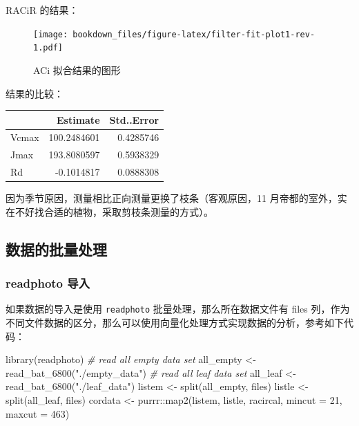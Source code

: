 \documentclass[
]{krantz}
\makeatletter
\newenvironment{Shaded}{\begin{snugshade}}{\end{snugshade}}
\newcommand{\AttributeTok}[1]{\textcolor[rgb]{0.77,0.63,0.00}{#1}}
\newcommand{\CommentTok}[1]{\textcolor[rgb]{0.56,0.35,0.01}{\textit{#1}}}
\newcommand{\DecValTok}[1]{\textcolor[rgb]{0.00,0.00,0.81}{#1}}
\newcommand{\FunctionTok}[1]{\textcolor[rgb]{0.00,0.00,0.00}{#1}}
\newcommand{\NormalTok}[1]{#1}
\newcommand{\OtherTok}[1]{\textcolor[rgb]{0.56,0.35,0.01}{#1}}
\newcommand{\SpecialCharTok}[1]{\textcolor[rgb]{0.00,0.00,0.00}{#1}}
\newcommand{\StringTok}[1]{\textcolor[rgb]{0.31,0.60,0.02}{#1}}
\newenvironment{kframe}{%
\medskip{}
\setlength{\fboxsep}{.8em}
 \def\at@end@of@kframe{}%
 \ifinner\ifhmode%
  \def\at@end@of@kframe{\end{minipage}}%
  \begin{minipage}{\columnwidth}%
 \fi\fi%
 \def\FrameCommand##1{\hskip\@totalleftmargin \hskip-\fboxsep
 \colorbox{shadecolor}{##1}\hskip-\fboxsep
     \hskip-\linewidth \hskip-\@totalleftmargin \hskip\columnwidth}%
 \MakeFramed {\advance\hsize-\width
   \@totalleftmargin\z@ \linewidth\hsize
   \@setminipage}}%
 {\par\unskip\endMakeFramed%
 \at@end@of@kframe}
\renewenvironment{Shaded}{\begin{kframe}}{\end{kframe}}
\makeatother
\begin{document}
RACiR 的结果：

\begin{figure}
\centering
\texttt{[image: bookdown\_files/figure-latex/filter-fit-plot1-rev-1.pdf]}
\caption{\label{fig:filter-fit-plot1-rev}ACi 拟合结果的图形}
\end{figure}

结果的比较：

\begin{tabular}{l|r|r}
\hline
  & Estimate & Std..Error\\
\hline
Vcmax & 100.2484601 & 0.4285746\\
\hline
Jmax & 193.8080597 & 0.5938329\\
\hline
Rd & -0.1014817 & 0.0888308\\
\hline
\end{tabular}

因为季节原因，测量相比正向测量更换了枝条（客观原因，11 月帝都的室外，实在不好找合适的植物，采取剪枝条测量的方式）。

\hypertarget{racirbatch}{%
\subsection{数据的批量处理}\label{racirbatch}}

\hypertarget{imbyphoto}{%
\subsubsection{readphoto 导入}\label{imbyphoto}}

如果数据的导入是使用 \texttt{readphoto} 批量处理，那么所在数据文件有 files 列，作为不同文件数据的区分，那么可以使用向量化处理方式实现数据的分析，参考如下代码：

\begin{Shaded}
\begin{Highlighting}[]
\FunctionTok{library}\NormalTok{(readphoto)}
\CommentTok{\# read all empty data set}
\NormalTok{all\_empty }\OtherTok{\textless{}{-}} \FunctionTok{read\_bat\_6800}\NormalTok{(}\StringTok{"./empty\_data"}\NormalTok{)}
\CommentTok{\# read all leaf data set}
\NormalTok{all\_leaf }\OtherTok{\textless{}{-}} \FunctionTok{read\_bat\_6800}\NormalTok{(}\StringTok{"./leaf\_data"}\NormalTok{)}
\NormalTok{listem  }\OtherTok{\textless{}{-}}  \FunctionTok{split}\NormalTok{(all\_empty, files)}
\NormalTok{listle }\OtherTok{\textless{}{-}}  \FunctionTok{split}\NormalTok{(all\_leaf, files)}
\NormalTok{cordata }\OtherTok{\textless{}{-}}\NormalTok{ purrr}\SpecialCharTok{::}\FunctionTok{map2}\NormalTok{(listem, listle, racircal, }\AttributeTok{mincut =} \DecValTok{21}\NormalTok{, }\AttributeTok{maxcut =} \DecValTok{463}\NormalTok{)}
\end{Highlighting}
\end{Shaded}
\end{document}
